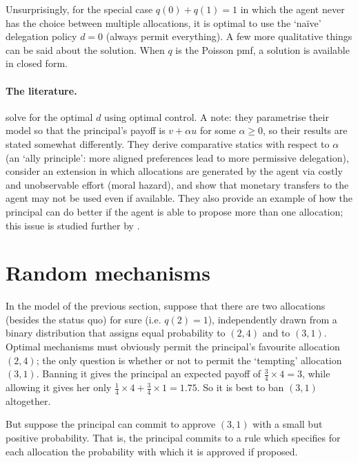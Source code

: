 Unsurprisingly, for the special case $q(0)+q(1)=1$ in which the agent never has the choice between multiple allocations,
it is optimal to use the `naïve' delegation policy $d = 0$ (always permit everything).
A few more qualitative things can be said about the solution. When $q$ is the Poisson pmf, a solution is available in closed form.


\paragraph{The literature.}
\textcite{ArmstrongVickers2010} solve for the optimal $d$ using optimal control.
A note: they parametrise their model so that the principal's payoff is $v + \alpha u$ for some $\alpha \geq 0$, so their results are stated somewhat differently.
They derive comparative statics with respect to $\alpha$ (an `ally principle': more aligned preferences lead to more permissive delegation),
consider an extension in which allocations are generated by the agent via costly and unobservable effort (moral hazard),
and show that monetary transfers to the agent may not be used even if available.
They also provide an example of how the principal can do better if the agent is able to propose more than one allocation; this issue is studied further by \textcite{GuoShmaya2022}.



\section{Random mechanisms}
\label{sec:ch4:random}

In the model of the previous section,
suppose that there are two allocations (besides the status quo) for sure (i.e. $q(2)=1$), independently drawn from a binary distribution
that assigns equal probability to $(2,4)$ and to $(3,1)$.
Optimal mechanisms must obviously permit the principal's favourite allocation $(2,4)$;
the only question is whether or not to permit the `tempting' allocation $(3,1)$.
Banning it gives the principal an expected payoff of $\frac{3}{4} \times 4 = 3$,
while allowing it gives her only $\frac{1}{4} \times 4 + \frac{3}{4} \times 1 = 1.75$.
So it is best to ban $(3,1)$ altogether.

But suppose the principal can commit to approve $(3,1)$ with a small but positive probability.
That is, the principal commits to a rule
which specifies for each allocation the probability with which it is approved if proposed.

